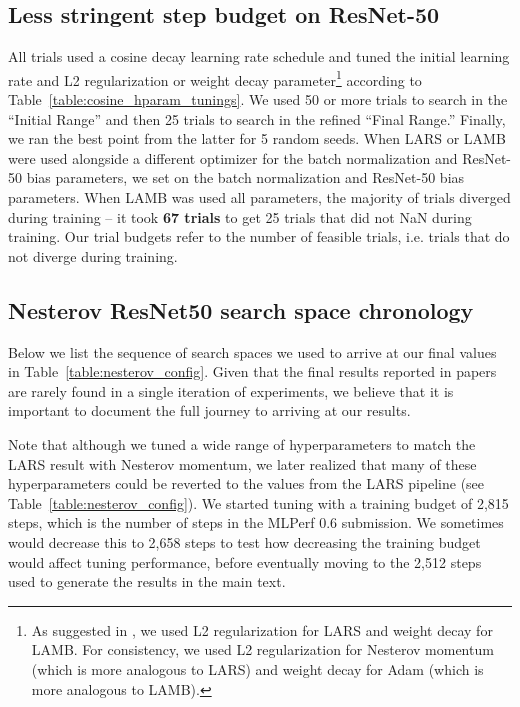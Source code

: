 \documentclass{article}
\begin{document}
\subsection{Less stringent step budget on ResNet-50}
\label{appendix:cosine_details}
All trials used a cosine decay learning rate schedule and tuned the initial learning rate  and L2 regularization or weight decay parameter\footnote{As suggested in \citet{you2019lamb}, we used L2 regularization for LARS and weight decay for LAMB. For consistency, we used L2 regularization for Nesterov momentum (which is more analogous to LARS) and weight decay for Adam (which is more analogous to LAMB).}  according to Table~\ref{table:cosine_hparam_tunings}. We used 50 or more trials to search in the ``Initial Range'' and then 25 trials to search in the refined ``Final Range.'' Finally, we ran the best point from the latter for 5 random seeds. When LARS or LAMB were used alongside a different optimizer for the batch normalization and ResNet-50 bias parameters, we set  on the batch normalization and ResNet-50 bias parameters. When LAMB was used all parameters, the majority of trials diverged during training -- it took \textbf{67 trials} to get 25 trials that did not NaN during training. Our trial budgets refer to the number of feasible trials, i.e. trials that do not diverge during training.





\subsection{Nesterov ResNet50 search space chronology}
\label{appendix:historical_search_spaces_nesterov_resnet50}

Below we list the sequence of search spaces we used to arrive at our final values in Table~\ref{table:nesterov_config}. Given that the final results reported in papers are rarely found in a single iteration of experiments, we believe that it is important to document the full journey to arriving at our results. 

Note that although we tuned a wide range of hyperparameters to match the LARS result with Nesterov momentum, we later realized that many of these hyperparameters could be reverted to the values from the LARS pipeline (see Table~\ref{table:nesterov_config}).
We started tuning with a training budget of 2,815 steps, which is the number of steps in the MLPerf 0.6 submission. We sometimes would decrease this to 2,658 steps to test how decreasing the training budget would affect tuning performance, before eventually moving to the 2,512 steps used to generate the results in the main text.
\end{document}
